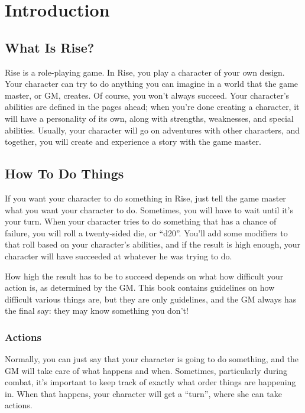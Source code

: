 \chapter{Introduction}

\section{What Is Rise?} 
Rise is a role-playing game. In Rise, you play a character of your own design. Your character can try to do anything you can imagine in a world that the game master, or GM, creates. Of course, you won't always succeed. Your character's abilities are defined in the pages ahead; when you're done creating a character, it will have a personality of its own, along with strengths, weaknesses, and special abilities. Usually, your character will go on adventures with other characters, and together, you will create and experience a story with the game master.

\section{How To Do Things}
If you want your character to do something in Rise, just tell the game master what you want your character to do. Sometimes, you will have to wait until it's your turn. When your character tries to do something that has a chance of failure, you will roll a twenty-sided die, or ``d20''. You'll add some modifiers to that roll based on your character's abilities, and if the result is high enough, your character will have succeeded at whatever he was trying to do.

How high the result has to be to succeed depends on what how difficult your action is, as determined by the GM. This book contains guidelines on how difficult various things are, but they are only guidelines, and the GM always has the final say: they may know something you don't!

\subsection{Actions}
Normally, you can just say that your character is going to do something, and the GM will take care of what happens and when. Sometimes, particularly during combat, it's important to keep track of exactly what order things are happening in. When that happens, your character will get a ``turn'', where she can take actions.

